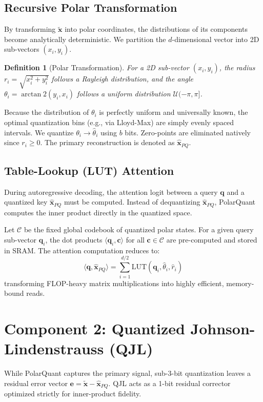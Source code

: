 \documentclass[11pt]{article}
\newtheorem{definition}{Definition}
\begin{document}
\subsection{Recursive Polar Transformation}
By transforming $\tilde{\mathbf{x}}$ into polar coordinates, the distributions of its components become analytically deterministic. We partition the $d$-dimensional vector into 2D sub-vectors $(x_i, y_i)$. 

\begin{definition}[Polar Transformation]
For a 2D sub-vector $(x_i, y_i)$, the radius $r_i = \sqrt{x_i^2 + y_i^2}$ follows a Rayleigh distribution, and the angle $\theta_i = \arctan2(y_i, x_i)$ follows a uniform distribution $\mathcal{U}(-\pi, \pi]$.
\end{definition}

Because the distribution of $\theta_i$ is perfectly uniform and universally known, the optimal quantization bins (e.g., via Lloyd-Max) are simply evenly spaced intervals. We quantize $\theta_i \to \hat{\theta}_i$ using $b$ bits. Zero-points are eliminated natively since $r_i \ge 0$. The primary reconstruction is denoted as $\hat{\mathbf{x}}_{PQ}$.

\subsection{Table-Lookup (LUT) Attention}
During autoregressive decoding, the attention logit between a query $\mathbf{q}$ and a quantized key $\hat{\mathbf{x}}_{PQ}$ must be computed. Instead of dequantizing $\hat{\mathbf{x}}_{PQ}$, PolarQuant computes the inner product directly in the quantized space. 

Let $\mathcal{C}$ be the fixed global codebook of quantized polar states. For a given query sub-vector $\mathbf{q}_i$, the dot products $\langle \mathbf{q}_i, \mathbf{c} \rangle$ for all $\mathbf{c} \in \mathcal{C}$ are pre-computed and stored in SRAM. The attention computation reduces to:
\begin{equation}
\langle \mathbf{q}, \hat{\mathbf{x}}_{PQ} \rangle = \sum_{i=1}^{d/2} \text{LUT}(\mathbf{q}_i, \hat{\theta}_i, \hat{r}_i)
\end{equation}
transforming FLOP-heavy matrix multiplications into highly efficient, memory-bound reads.

\section{Component 2: Quantized Johnson-Lindenstrauss (QJL)}
While PolarQuant captures the primary signal, sub-3-bit quantization leaves a residual error vector $\mathbf{e} = \tilde{\mathbf{x}} - \hat{\mathbf{x}}_{PQ}$. QJL acts as a 1-bit residual corrector optimized strictly for inner-product fidelity.
\end{document}
